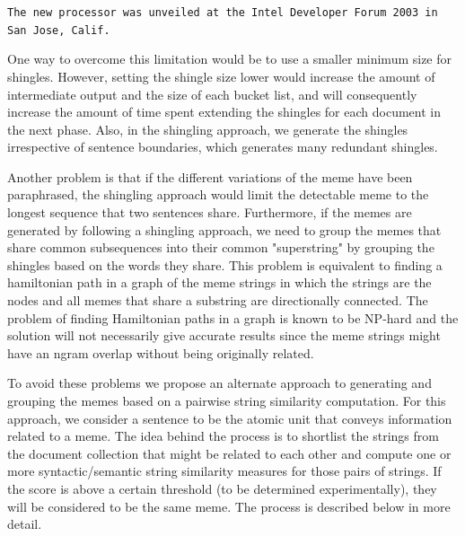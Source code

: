 \documentclass{acm_proc_article-sp}
\begin{document}
{\tt The new processor was unveiled at the Intel Developer Forum 2003 in San Jose, Calif.}

One way to overcome this limitation would be to use a smaller minimum size for shingles. However, setting the shingle size lower would increase the amount of intermediate output and the size of each bucket list, and will consequently increase the amount of time spent extending the shingles for each document in the next phase. Also, in the shingling approach, we generate the shingles irrespective of sentence boundaries, which generates many redundant shingles.


Another problem is that if the different variations of the meme have been paraphrased, the shingling approach would limit the detectable meme to the longest sequence that two sentences share. Furthermore, if the memes are generated by following a shingling approach, we need to group the memes that share common subsequences into their common "superstring" by grouping the shingles based on the words they share. This problem is equivalent to finding a hamiltonian path in a graph of the meme strings in which the strings are the nodes and all memes that share a substring are directionally connected. The problem of finding Hamiltonian paths in a graph is known to be NP-hard and the solution will not necessarily give accurate results since the meme strings might have an ngram overlap without being originally related.

To avoid these problems we propose an alternate approach to generating and grouping the memes based on a pairwise string similarity computation. For this approach, we consider a sentence to be the atomic unit that conveys information related to a meme. The idea behind the process is to shortlist the strings from the document collection that might be related to each other and compute one or more syntactic/semantic string similarity measures for those pairs of strings. If the score is above a certain threshold (to be determined experimentally), they will be considered to be the same meme. The process is described below in more detail.
\end{document}
